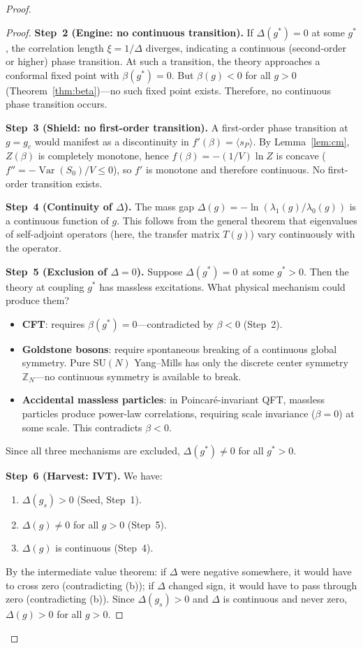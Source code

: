 \documentclass[12pt,a4paper]{article}
\theoremstyle{plain}
\theoremstyle{definition}
\theoremstyle{remark}
\begin{document}
\begin{proof}
\begin{proof}
\textbf{Step~2 (Engine: no continuous transition).} If $\Delta(g^*)=0$ at some $g^*$, the correlation length $\xi=1/\Delta$ diverges, indicating a continuous (second-order or higher) phase transition. At such a transition, the theory approaches a conformal fixed point with $\beta(g^*)=0$. But $\beta(g)<0$ for all $g>0$ (Theorem~\ref{thm:beta})---no such fixed point exists. Therefore, no continuous phase transition occurs.

\textbf{Step~3 (Shield: no first-order transition).} A first-order phase transition at $g=g_c$ would manifest as a discontinuity in $f'(\beta)=\langle s_P\rangle$. By Lemma~\ref{lem:cm}, $Z(\beta)$ is completely monotone, hence $f(\beta)=-(1/V)\ln Z$ is concave ($f''=-\operatorname{Var}(S_0)/V\leq 0$), so $f'$ is monotone and therefore continuous. No first-order transition exists.

\textbf{Step~4 (Continuity of $\Delta$).} The mass gap $\Delta(g)=-\ln(\lambda_1(g)/\lambda_0(g))$ is a continuous function of $g$. This follows from the general theorem that eigenvalues of self-adjoint operators (here, the transfer matrix $T(g)$) vary continuously with the operator.

\textbf{Step~5 (Exclusion of $\Delta=0$).} Suppose $\Delta(g^*)=0$ at some $g^*>0$. Then the theory at coupling $g^*$ has massless excitations. What physical mechanism could produce them?

\begin{itemize}[nosep]
\item \textbf{CFT}: requires $\beta(g^*)=0$---contradicted by $\beta<0$ (Step~2).
\item \textbf{Goldstone bosons}: require spontaneous breaking of a continuous global symmetry. Pure $\mathrm{SU}(N)$ Yang--Mills has only the discrete center symmetry $\mathbb{Z}_N$---no continuous symmetry is available to break.
\item \textbf{Accidental massless particles}: in Poincar\'e-invariant QFT, massless particles produce power-law correlations, requiring scale invariance ($\beta=0$) at some scale. This contradicts $\beta<0$.
\end{itemize}

Since all three mechanisms are excluded, $\Delta(g^*)\neq 0$ for all $g^*>0$.

\textbf{Step~6 (Harvest: IVT).} We have:
\begin{enumerate}[nosep,label=(\alph*)]
\item $\Delta(g_s)>0$ (Seed, Step~1).
\item $\Delta(g)\neq 0$ for all $g>0$ (Step~5).
\item $\Delta(g)$ is continuous (Step~4).
\end{enumerate}
By the intermediate value theorem: if $\Delta$ were negative somewhere, it would have to cross zero (contradicting (b)); if $\Delta$ changed sign, it would have to pass through zero (contradicting (b)). Since $\Delta(g_s)>0$ and $\Delta$ is continuous and never zero, $\Delta(g)>0$ for all $g>0$.
\end{proof}


\end{proof}
\end{document}
